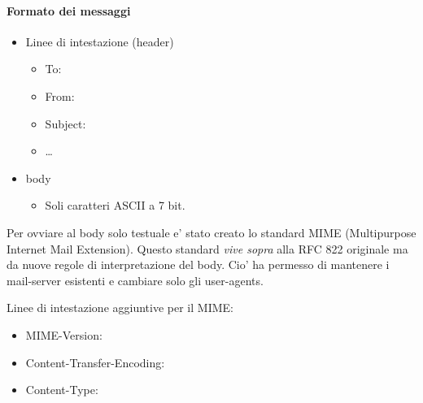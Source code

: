 \newpage
\paragraph{Formato dei messaggi}
\begin{itemize}
    \item Linee di intestazione (header)
    \begin{itemize}
        \item To:
        \item From:
        \item Subject:
        \item \dots
    \end{itemize}
    \item body
    \begin{itemize}
        \item Soli caratteri ASCII a 7 bit.
    \end{itemize}
\end{itemize}

Per ovviare al body solo testuale e' stato creato lo standard MIME (Multipurpose Internet Mail Extension).
Questo standard \textit{vive sopra} alla RFC 822 originale ma da nuove regole di interpretazione del body. Cio' ha permesso di mantenere i mail-server esistenti e cambiare solo gli user-agents.

Linee di intestazione aggiuntive per il MIME:
\begin{itemize}
    \item MIME-Version:
    \item Content-Transfer-Encoding:
    \item Content-Type:
\end{itemize}

